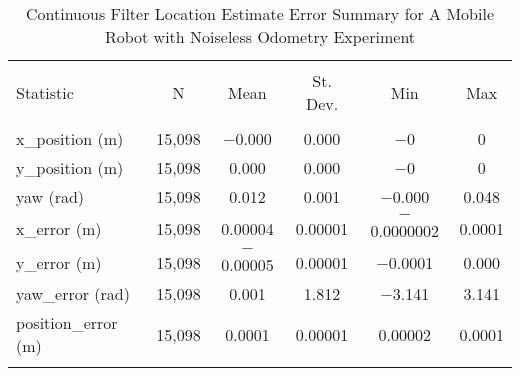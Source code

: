
\begin{table}[htbp] \centering 
  \caption{Continuous Filter Location Estimate Error Summary for A Mobile Robot with Noiseless Odometry Experiment} 
  \label{tab:one_mobile_noiseless_no_gps_continuous_summary} 
\begin{tabular}{@{\extracolsep{5pt}}lccccc} 
\\[-1.8ex]\hline 
\hline \\[-1.8ex] 
Statistic & \multicolumn{1}{c}{N} & \multicolumn{1}{c}{Mean} & \multicolumn{1}{c}{St. Dev.} & \multicolumn{1}{c}{Min} & \multicolumn{1}{c}{Max} \\ 
\hline \\[-1.8ex] 
x\_position (m) & 15,098 & $-$0.000 & \num{0.000} & $-$0 & 0 \\ 
y\_position (m) & 15,098 & \num{0.000} & \num{0.000} & $-$0 & 0 \\ 
yaw (rad) & 15,098 & \num{0.012} & \num{0.001} & $-$0.000 & \num{0.048} \\ 
x\_error (m) & 15,098 & \num{0.00004} & \num{0.00001} & $-$0.0000002 & \num{0.0001} \\ 
y\_error (m) & 15,098 & $-$0.00005 & \num{0.00001} & $-$0.0001 & \num{0.000} \\
yaw\_error (rad) & 15,098 & \num{0.001} & \num{1.812} & $-$3.141 & \num{3.141} \\
position\_error (m) & 15,098 & \num{0.0001} & \num{0.00001} & \num{0.00002} & \num{0.0001} \\ 
\hline \\[-1.8ex] 
\end{tabular} 
\end{table} 

